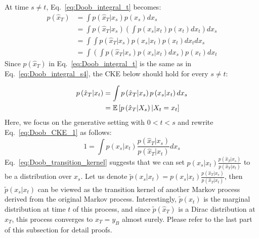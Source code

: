 At time $s\neq t$, Eq.~\ref{eq:Doob_integral_t} becomes: 
\begin{align}
p\left(\hat{x}_{T}\right) & =\int p\left(\hat{x}_{T}|x_{s}\right)p\left(x_{s}\right)dx_{s}\\
 & =\int p\left(\hat{x}_{T}|x_{s}\right)\left(\int p\left(x_{s}|x_{t}\right)p\left(x_{t}\right)dx_{t}\right)dx_{s}\\
 & =\int\int p\left(\hat{x}_{T}|x_{s}\right)p\left(x_{s}|x_{t}\right)p\left(x_{t}\right)dx_{t}dx_{s}\\
 & =\int\left(\int p\left(\hat{x}_{T}|x_{s}\right)p\left(x_{s}|x_{t}\right)dx_{s}\right)p\left(x_{t}\right)dx_{t}\label{eq:Doob_integral_s4}
\end{align}
Since $p\left(\hat{x}_{T}\right)$ in Eq.~\ref{eq:Doob_integral_t}
is the same as in Eq.~\ref{eq:Doob_integral_s4}, the CKE below should
hold for every $s\neq t$:

\begin{align}
p\left(\hat{x}_{T}|x_{t}\right) & =\int p\left(\hat{x}_{T}|x_{s}\right)p\left(x_{s}|x_{t}\right)dx_{s}\label{eq:Doob_CKE_1}\\
 & =\mathbb{E}\left[p\left(\hat{x}_{T}|X_{s}\right)|X_{t}=x_{t}\right]\label{eq:Doob_CKE_2}
\end{align}
Here, we focus on the generative setting with $0<t<s$ and rewrite
Eq.~\ref{eq:Doob_CKE_1} as follows:
\begin{equation}
1=\int p\left(x_{s}|x_{t}\right)\frac{p\left(\hat{x}_{T}|x_{s}\right)}{p\left(\hat{x}_{T}|x_{t}\right)}dx_{s}\label{eq:Doob_transition_kernel}
\end{equation}
Eq.~\ref{eq:Doob_transition_kernel} suggests that we can set $p\left(x_{s}|x_{t}\right)\frac{p\left(\hat{x}_{T}|x_{s}\right)}{p\left(\hat{x}_{T}|x_{t}\right)}$
to be a distribution over $x_{s}$. Let us denote $\tilde{p}\left(x_{s}|x_{t}\right)=p\left(x_{s}|x_{t}\right)\frac{p\left(\hat{x}_{T}|x_{s}\right)}{p\left(\hat{x}_{T}|x_{t}\right)}$,
then $\tilde{p}\left(x_{s}|x_{t}\right)$ can be viewed as the transition
kernel of another Markov process derived from the original Markov
process. Interestingly, $\tilde{p}\left(x_{t}\right)$ is the marginal
distribution at time $t$ of this process, and since $\tilde{p}\left(\hat{x}_{T}\right)$
is a Dirac distribution at $\hat{x}_{T}$, this process converges
to $\hat{x}_{T}=y_{B}$ almost surely. Please refer to the last part
of this subsection for detail proofs.


